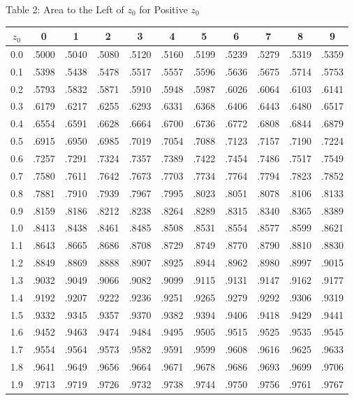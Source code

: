 \documentclass[11pt]{article}
\begin{document}
\begin{distbox}{Table 2: Area to the Left of $z_0$ for Positive $z_0$}
\begin{tabular}{c|cccccccccc}
\toprule
$z_0$ & 0 & 1 & 2 & 3 & 4 & 5 & 6 & 7 & 8 & 9 \\
\midrule
0.0 & .5000 & .5040 & .5080 & .5120 & .5160 & .5199 & .5239 & .5279 & .5319 & .5359 \\
0.1 & .5398 & .5438 & .5478 & .5517 & .5557 & .5596 & .5636 & .5675 & .5714 & .5753 \\
0.2 & .5793 & .5832 & .5871 & .5910 & .5948 & .5987 & .6026 & .6064 & .6103 & .6141 \\
0.3 & .6179 & .6217 & .6255 & .6293 & .6331 & .6368 & .6406 & .6443 & .6480 & .6517 \\
0.4 & .6554 & .6591 & .6628 & .6664 & .6700 & .6736 & .6772 & .6808 & .6844 & .6879 \\
0.5 & .6915 & .6950 & .6985 & .7019 & .7054 & .7088 & .7123 & .7157 & .7190 & .7224 \\
0.6 & .7257 & .7291 & .7324 & .7357 & .7389 & .7422 & .7454 & .7486 & .7517 & .7549 \\
0.7 & .7580 & .7611 & .7642 & .7673 & .7703 & .7734 & .7764 & .7794 & .7823 & .7852 \\
0.8 & .7881 & .7910 & .7939 & .7967 & .7995 & .8023 & .8051 & .8078 & .8106 & .8133 \\
0.9 & .8159 & .8186 & .8212 & .8238 & .8264 & .8289 & .8315 & .8340 & .8365 & .8389 \\
1.0 & .8413 & .8438 & .8461 & .8485 & .8508 & .8531 & .8554 & .8577 & .8599 & .8621 \\
1.1 & .8643 & .8665 & .8686 & .8708 & .8729 & .8749 & .8770 & .8790 & .8810 & .8830 \\
1.2 & .8849 & .8869 & .8888 & .8907 & .8925 & .8944 & .8962 & .8980 & .8997 & .9015 \\
1.3 & .9032 & .9049 & .9066 & .9082 & .9099 & .9115 & .9131 & .9147 & .9162 & .9177 \\
1.4 & .9192 & .9207 & .9222 & .9236 & .9251 & .9265 & .9279 & .9292 & .9306 & .9319 \\
1.5 & .9332 & .9345 & .9357 & .9370 & .9382 & .9394 & .9406 & .9418 & .9429 & .9441 \\
1.6 & .9452 & .9463 & .9474 & .9484 & .9495 & .9505 & .9515 & .9525 & .9535 & .9545 \\
1.7 & .9554 & .9564 & .9573 & .9582 & .9591 & .9599 & .9608 & .9616 & .9625 & .9633 \\
1.8 & .9641 & .9649 & .9656 & .9664 & .9671 & .9678 & .9686 & .9693 & .9699 & .9706 \\
1.9 & .9713 & .9719 & .9726 & .9732 & .9738 & .9744 & .9750 & .9756 & .9761 & .9767 \\

\end{tabular}
\end{distbox}
\end{document}
